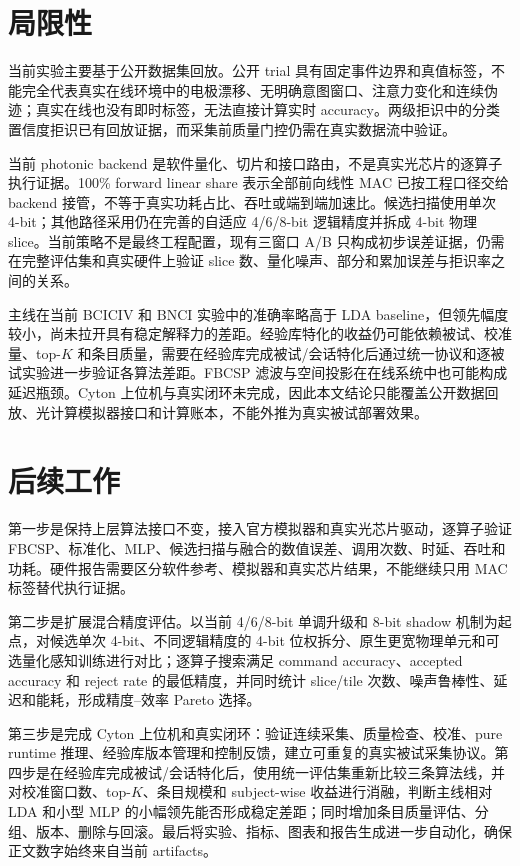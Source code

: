 \documentclass[
    TwoSide=false,
    Degree=graduate,
    GradLevel=master,
    Type=thesis,
    Title={光电混合运动想象脑机接口技术文档}
]{zjuthesis}
\begin{document}
\chapter{局限性}
当前实验主要基于公开数据集回放。公开 trial 具有固定事件边界和真值标签，不能完全代表真实在线环境中的电极漂移、无明确意图窗口、注意力变化和连续伪迹；真实在线也没有即时标签，无法直接计算实时 accuracy。两级拒识中的分类置信度拒识已有回放证据，而采集前质量门控仍需在真实数据流中验证。

当前 photonic backend 是软件量化、切片和接口路由，不是真实光芯片的逐算子执行证据。100\% forward linear share 表示全部前向线性 MAC 已按工程口径交给 backend 接管，不等于真实功耗占比、吞吐或端到端加速比。候选扫描使用单次 4-bit；其他路径采用仍在完善的自适应 4/6/8-bit 逻辑精度并拆成 4-bit 物理 slice。当前策略不是最终工程配置，现有三窗口 A/B 只构成初步误差证据，仍需在完整评估集和真实硬件上验证 slice 数、量化噪声、部分和累加误差与拒识率之间的关系。

主线在当前 BCICIV 和 BNCI 实验中的准确率略高于 LDA baseline，但领先幅度较小，尚未拉开具有稳定解释力的差距。经验库特化的收益仍可能依赖被试、校准量、top-$K$ 和条目质量，需要在经验库完成被试/会话特化后通过统一协议和逐被试实验进一步验证各算法差距。FBCSP 滤波与空间投影在在线系统中也可能构成延迟瓶颈。Cyton 上位机与真实闭环未完成，因此本文结论只能覆盖公开数据回放、光计算模拟器接口和计算账本，不能外推为真实被试部署效果。

\chapter{后续工作}
第一步是保持上层算法接口不变，接入官方模拟器和真实光芯片驱动，逐算子验证 FBCSP、标准化、MLP、候选扫描与融合的数值误差、调用次数、时延、吞吐和功耗。硬件报告需要区分软件参考、模拟器和真实芯片结果，不能继续只用 MAC 标签替代执行证据。

第二步是扩展混合精度评估。以当前 4/6/8-bit 单调升级和 8-bit shadow 机制为起点，对候选单次 4-bit、不同逻辑精度的 4-bit 位权拆分、原生更宽物理单元和可选量化感知训练进行对比；逐算子搜索满足 command accuracy、accepted accuracy 和 reject rate 的最低精度，并同时统计 slice/tile 次数、噪声鲁棒性、延迟和能耗，形成精度--效率 Pareto 选择。

第三步是完成 Cyton 上位机和真实闭环：验证连续采集、质量检查、校准、pure runtime 推理、经验库版本管理和控制反馈，建立可重复的真实被试采集协议。第四步是在经验库完成被试/会话特化后，使用统一评估集重新比较三条算法线，并对校准窗口数、top-$K$、条目规模和 subject-wise 收益进行消融，判断主线相对 LDA 和小型 MLP 的小幅领先能否形成稳定差距；同时增加条目质量评估、分组、版本、删除与回滚。最后将实验、指标、图表和报告生成进一步自动化，确保正文数字始终来自当前 artifacts。
\end{document}
